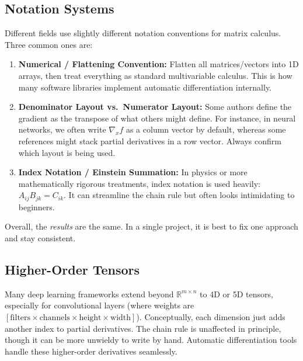 \documentclass[11pt]{article}
\newcommand{\R}{\mathbb{R}}
\begin{document}
\subsection{Notation Systems}
Different fields use slightly different notation conventions for matrix calculus. 
Three common ones are:
\begin{enumerate}
    \item \textbf{Numerical / Flattening Convention:} 
    Flatten all matrices/vectors into 1D arrays, 
    then treat everything as standard multivariable calculus. 
    This is how many software libraries implement automatic differentiation internally.

    \item \textbf{Denominator Layout vs.\ Numerator Layout:} 
    Some authors define the gradient as the transpose of what others might define. 
    For instance, in neural networks, we often write $\nabla_x f$ as a column vector by default, 
    whereas some references might stack partial derivatives in a row vector. 
    Always confirm which layout is being used.

    \item \textbf{Index Notation / Einstein Summation:} 
    In physics or more mathematically rigorous treatments, index notation is used heavily: 
    $A_{ij} B_{jk} = C_{ik}$. 
    It can streamline the chain rule but often looks intimidating to beginners.
\end{enumerate}

Overall, the \emph{results} are the same. 
In a single project, it is best to fix one approach and stay consistent.

\subsection{Higher-Order Tensors}
Many deep learning frameworks extend beyond $\R^{m\times n}$ to 4D or 5D tensors, 
especially for convolutional layers (where weights are $[ \text{filters} \times \text{channels} \times \text{height} \times \text{width} ]$). 
Conceptually, each dimension just adds another index to partial derivatives. 
The chain rule is unaffected in principle, though it can be more unwieldy to write by hand. 
Automatic differentiation tools handle these higher-order derivatives seamlessly.
\end{document}
